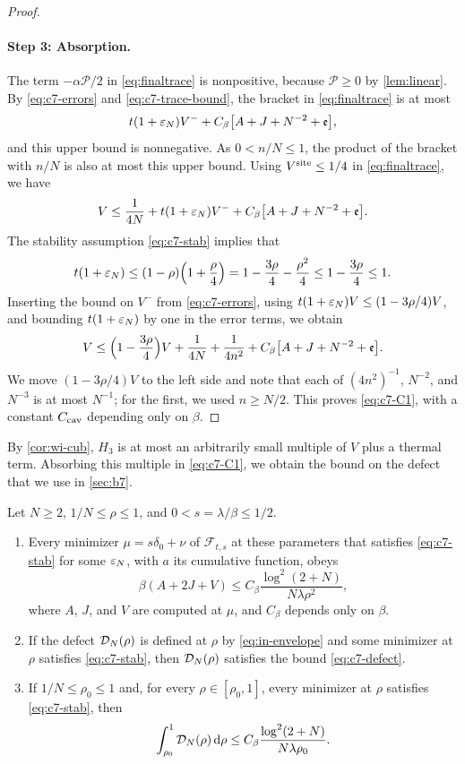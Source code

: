 \begin{proof}
\paragraph{Step 3: Absorption.} The term $-\alpha\mathcal P/2$ in
\eqref{eq:finaltrace} is nonpositive, because $\mathcal P\ge0$ by
\cref{lem:linear}. By \eqref{eq:c7-errors} and
\eqref{eq:c7-trace-bound}, the bracket in \eqref{eq:finaltrace} is at
most
\[
 t(1+\varepsilon_N)V^-+C_\beta\bigl[A+J+N^{-2}+\mathfrak e\bigr],
\]
and this upper bound is nonnegative. As $0<n/N\le1$, the product of the
bracket with $n/N$ is also at most this upper bound. Using $V^{\rm site}\le1/4$ in \eqref{eq:finaltrace},
we have
\[
 V\le\frac1{4N}+t(1+\varepsilon_N)V^-+C_\beta\bigl[A+J+N^{-2}+\mathfrak e\bigr].
\]
The stability assumption \eqref{eq:c7-stab} implies that
\[
 t(1+\varepsilon_N)\le(1-\rho)\Bigl(1+\frac\rho4\Bigr)
 =1-\frac{3\rho}4-\frac{\rho^2}4\le1-\frac{3\rho}4\le1 .
\]
Inserting the bound on $V^-$ from \eqref{eq:c7-errors}, using
$t(1+\varepsilon_N)V\le(1-3\rho/4)V$, and bounding $t(1+\varepsilon_N)$ by one in the
error terms, we obtain
\[
 V\le\Bigl(1-\frac{3\rho}4\Bigr)V+\frac1{4N}+\frac1{4n^2}
 +C_\beta\bigl[A+J+N^{-2}+\mathfrak e\bigr].
\]
We move $(1-3\rho/4)V$ to the left side and note that each of
$(4n^2)^{-1}$, $N^{-2}$, and $N^{-3}$ is at most $N^{-1}$; for the first,
we used $n\ge N/2$. This proves \eqref{eq:c7-C1}, with a constant $C_{\rm cav}$
depending only on $\beta$.
\end{proof}

By \cref{cor:wi-cub}, $H_3$ is at most an arbitrarily small multiple of
$V$ plus a thermal term. Absorbing this multiple in \eqref{eq:c7-C1}, we
obtain the bound on the defect that we use in \cref{sec:b7}.

\begin{corollary}\label{cor:c7-defect}
Let $N\ge2$, $1/N\le\rho\le1$, and $0<s=\lambda/\beta\le1/2$.
\begin{enumerate}[label=\textup{(\alph*)}]
\item Every minimizer $\mu=s\delta_0+\nu$ of $\mathcal F_{t,s}$ at these
parameters that satisfies \eqref{eq:c7-stab} for some $\varepsilon_N$, with $a$
its cumulative function, obeys
\begin{equation}\label{eq:c7-defect}
 \beta(A+2J+V)\le C_\beta\frac{\log^2(2+N)}{N\lambda\rho^2},
\end{equation}
where $A$, $J$, and $V$ are computed at $\mu$, and $C_\beta$ depends only
on $\beta$.
\item If the defect $\mathcal D_N(\rho)$ is defined at $\rho$ by
\eqref{eq:in-envelope} and some minimizer at $\rho$ satisfies
\eqref{eq:c7-stab}, then $\mathcal D_N(\rho)$ satisfies the bound
\eqref{eq:c7-defect}.
\item If $1/N\le\rho_0\le1$ and, for every $\rho\in[\rho_0,1]$, every
minimizer at $\rho$ satisfies \eqref{eq:c7-stab}, then
\begin{equation}\label{eq:c7-integrated}
 \int_{\rho_0}^1\mathcal D_N(\rho)\,\mathrm d\rho
 \le C_\beta\frac{\log^2(2+N)}{N\lambda\rho_0}.
\end{equation}
\end{enumerate}
\end{corollary}

